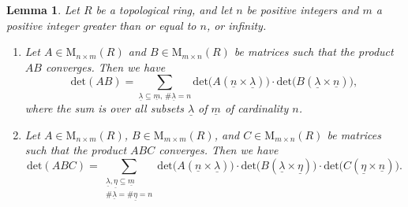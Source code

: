 \documentclass[12pt]{amsart}
\newtheorem{lemma}[subsection]{Lemma}
\theoremstyle{definition}
\numberwithin{equation}{subsection}
\def\rmM{\mathrm{M}}
\renewcommand{\det}{\mathrm{det}}
\begin{document}
\begin{lemma}
\label{L:det of ABC}
Let $R$ be a topological ring, and let $n$ be positive integers and $m$ a positive integer greater than or equal to $n$, or infinity.
\begin{enumerate}
\item Let $A \in \rmM_{n \times m}(R)$ and $B \in \rmM_{m \times n}(R)$ be matrices such that the product $AB$ converges. Then we have
$$
\det(AB)= 
\sum_{\underline \lambda \subseteq \underline{m}, \, \#\underline \lambda =n}\det\big(A(\underline n \times \underline \lambda )\big) \cdot  \det\big(B(\underline \lambda \times \underline n)\big),
$$
where the sum is over all subsets $\underline \lambda$ of $\underline m$ of cardinality $n$.
\item Let $A \in \rmM_{n \times m}(R)$, $B \in \rmM_{m \times m}(R)$, and $C \in\rmM_{m \times n}(R)$ be matrices such that the product $ABC$ converges.  Then we have
$$
\det(ABC) =\sum_{\substack{\underline \lambda, \underline \eta \subseteq \underline m\\\#\underline \lambda= \#\underline \eta = n}} \det\big(A(\underline n \times \underline \lambda)\big) \cdot \det\big( B(\underline \lambda \times \underline \eta) \big) \cdot \det\big(C(\underline \eta\times \underline n)\big).
$$
\end{enumerate}



\end{lemma}
\end{document}
